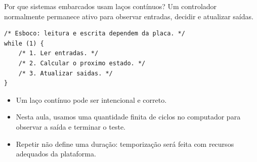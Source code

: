 \begin{frame}[fragile]{Por que sistemas embarcados usam laços contínuos?}
Um controlador normalmente permanece ativo para observar entradas, decidir e atualizar saídas.
\begin{lstlisting}
/* Esboco: leitura e escrita dependem da placa. */
while (1) {
    /* 1. Ler entradas. */
    /* 2. Calcular o proximo estado. */
    /* 3. Atualizar saidas. */
}
\end{lstlisting}
\begin{itemize}
\item Um laço contínuo pode ser intencional e correto.
\item Nesta aula, usamos uma quantidade finita de ciclos no computador para observar a saída e terminar o teste.
\item Repetir não define uma duração: temporização será feita com recursos adequados da plataforma.
\end{itemize}
\end{frame}
